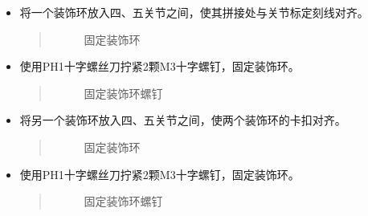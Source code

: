 \documentclass[a4paper,11pt,english,openany,oneside]{sphinxmanual}
\begin{document}
\begin{itemize}
\begin{itemize}
\begin{quote}
\begin{figure}[H]
\centering
\capstart

\noindent{}
\caption{固定装饰环螺钉}\label{\detokenize{_u66f4_u6362_u5173_u8282:id104}}\end{figure}
\end{quote}

\item {} 
\sphinxAtStartPar
将一个装饰环放入四、五关节之间，使其拼接处与关节标定刻线对齐。
\begin{quote}

\begin{figure}[H]
\centering
\capstart

\noindent{}
\caption{固定装饰环}\label{\detokenize{_u66f4_u6362_u5173_u8282:id105}}\end{figure}
\end{quote}

\item {} 
\sphinxAtStartPar
使用PH1十字螺丝刀拧紧2颗M3十字螺钉，固定装饰环。
\begin{quote}

\begin{figure}[H]
\centering
\capstart

\noindent{}
\caption{固定装饰环螺钉}\label{\detokenize{_u66f4_u6362_u5173_u8282:id106}}\end{figure}
\end{quote}

\item {} 
\sphinxAtStartPar
将另一个装饰环放入四、五关节之间，使两个装饰环的卡扣对齐。
\begin{quote}

\begin{figure}[H]
\centering
\capstart

\noindent{}
\caption{固定装饰环}\label{\detokenize{_u66f4_u6362_u5173_u8282:id107}}\end{figure}
\end{quote}

\item {} 
\sphinxAtStartPar
使用PH1十字螺丝刀拧紧2颗M3十字螺钉，固定装饰环。
\begin{quote}

\begin{figure}[H]
\centering
\capstart

\noindent{}
\caption{固定装饰环螺钉}\label{\detokenize{_u66f4_u6362_u5173_u8282:id108}}\end{figure}
\end{quote}

\end{itemize}

\end{itemize}
\end{document}

